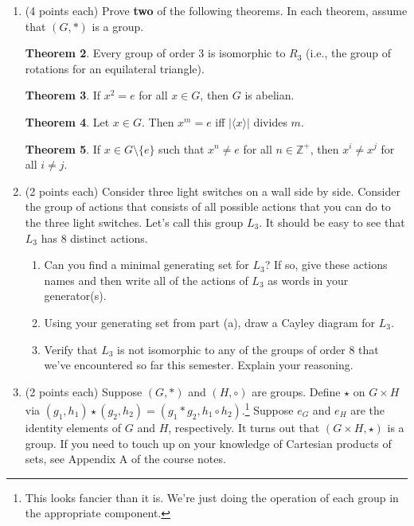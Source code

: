 \documentclass[11pt]{article}
\theoremstyle{definition}
\newtheorem{theorem}{Theorem}
\begin{document}
\begin{enumerate}
\begin{theorem}
Coming soon.
\end{theorem}

\item (4 points each) Prove \textbf{two} of the following theorems. In each theorem, assume that $(G,*)$ is a group.

\begin{theorem}
Every group of order 3 is isomorphic to $R_3$ (i.e., the group of rotations for an equilateral triangle).
\end{theorem}

\begin{theorem}
If $x^2=e$ for all $x\in G$, then $G$ is abelian.
\end{theorem}

\begin{theorem}
Let $x\in G$. Then $x^m=e$ iff $|\langle x\rangle|$ divides $m$.
\end{theorem}

\begin{theorem}
If $x\in G\setminus\{e\}$ such that $x^n\neq e$ for all $n\in \mathbb{Z}^+$, then $x^i\neq x^j$ for all $i\neq j$.
\end{theorem}

\item (2 points each) Consider three light switches on a wall side by side.  Consider the group of actions that consists of all possible actions that you can do to the three light switches.  Let's call this group $L_3$. It should be easy to see that $L_3$ has 8 distinct actions.
\begin{enumerate}[label=\rm{(\alph*)}]
\item Can you find a minimal generating set for $L_3$?  If so, give these actions names and then write all of the actions of $L_3$ as words in your generator(s).
\item Using your generating set from part (a), draw a Cayley diagram for $L_3$.
\item Verify that $L_3$ is not isomorphic to any of the groups of order 8 that we've encountered so far this semester.  Explain your reasoning.
\end{enumerate}

\newpage

\item (2 points each) Suppose $(G,*)$ and $(H,\circ)$ are groups.  Define $\star$ on $G\times H$ via $(g_1,h_1)\star(g_2,h_2)=(g_1*g_2,h_1\circ h_2)$.\footnote{This looks fancier than it is.  We're just doing the operation of each group in the appropriate component.}  Suppose $e_G$ and $e_H$ are the identity elements of $G$ and $H$, respectively.  It turns out that $(G\times H,\star)$ is a group.  If you need to touch up on your knowledge of Cartesian products of sets, see Appendix A of the course notes.


\end{enumerate}
\end{document}
